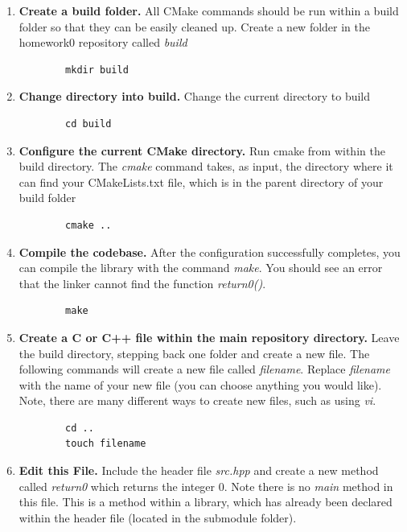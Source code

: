 \documentclass{article} %
\begin{document}
\begin{enumerate}
    \item \textbf{Create a build folder.}  All CMake commands should be run within a build folder so that they can be easily cleaned up.  Create a new folder in the homework0 repository called \emph{build}
    \begin{verbatim}
        mkdir build
    \end{verbatim}

    \item \textbf{Change directory into build.}  Change the current directory to build \begin{verbatim}
        cd build
    \end{verbatim}

    \item \textbf{Configure the current CMake directory.}  Run cmake from within the build directory.  The \emph{cmake} command takes, as input, the directory where it can find your CMakeLists.txt file, which is in the parent directory of your build folder
    \begin{verbatim}
        cmake ..
    \end{verbatim}
    

    \item \textbf{Compile the codebase.} After the configuration successfully completes, you can compile the library with the command \emph{make}.  You should see an error that the linker cannot find the function \emph{return0()}.
    \begin{verbatim}
        make
    \end{verbatim}

    \item \textbf{Create a C or C++ file within the main repository directory.}  Leave the build directory, stepping back one folder and create a new file.  The following commands will create a new file called \emph{filename}.  Replace \emph{filename} with the name of your new file (you can choose anything you would like).  Note, there are many different ways to create new files, such as using \emph{vi}.
    \begin{verbatim}
        cd ..
        touch filename
    \end{verbatim}

    \item \textbf{Edit this File.}  Include the header file \emph{src.hpp} and create a new method called \emph{return0} which returns the integer 0.  Note there is no \emph{main} method in this file.  This is a method within a library, which has already been declared within the header file (located in the submodule folder).


\end{enumerate}
\end{document}
